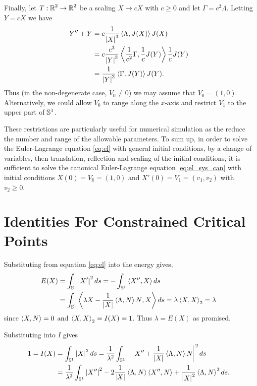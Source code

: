 \documentclass[12pt]{article}
\begin{document}
Finally, let \(T : \operatorname{\mathbb{R}}^2 \to \operatorname{\mathbb{R}}^2\) be a scaling \(X \mapsto cX\) with \(c \geq 0\) and let \(\Gamma = c^2 \Lambda\). Letting \(Y = cX\) we have
\[
\begin{split}
Y'' + Y &= c \frac{1}{\left|{X}\right|^3} \left\langle{\Lambda},{J(X)}\right\rangle J(X) \\
&= c \frac{c^3}{\left|{Y}\right|^3} \left\langle{\frac{1}{c^2} \Gamma},{\frac{1}{c} J(Y)}\right\rangle \frac{1}{c} J(Y) \\
&= \frac{1}{\left|{Y}\right|^3} \left\langle{\Gamma},{J(Y)}\right\rangle J(Y).
\end{split}
\]
Thus (in the non-degenerate case, \(V_0 \ne 0\)) we may assume that \(V_0 = (1, 0)\). Alternatively, we could allow \(V_0\) to range along the \(x\)-axis and restrict \(V_1\) to the upper part of \(\operatorname{\mathbb{S}^1}\).

These restrictions are particularly useful for numerical simulation as the reduce the number and range of the allowable parameters. To sum up, in order to solve the Euler-Lagrange equation \eqref{eq:el} with general initial conditions, by a change of variables, then translation, reflection and scaling of the initial conditions, it is sufficient to solve the canonical Euler-Lagrange equation \eqref{eq:el_sys_can} with initial conditions \(X(0) = V_0 = (1, 0)\) and \(X'(0) = V_1 = (v_1, v_2)\) with \(v_2 \geq 0\).

\section{Identities For Constrained Critical Points}

Substituting from equation \eqref{eq:el} into the energy gives,
\begin{equation}
\label{eq:Ecrit}
\begin{split}
E(X) &= \int_{\operatorname{\mathbb{S}^1}} \left|{X'}\right|^2 ds = -\int_{\operatorname{\mathbb{S}^1}} \left\langle{X''},{X}\right\rangle ds \\
&= \int_{\operatorname{\mathbb{S}^1}} \left\langle{\lambda X - \frac{1}{\left|{X}\right|} \ensuremath{\left\langle{\Lambda},{N}\right\rangle}N},{X}\right\rangle ds = \lambda \left\langle{X},{X}\right\rangle_2 = \lambda
\end{split}
\end{equation}
since \(\left\langle{X},{N}\right\rangle = 0\) and \(\left\langle{X},{X}\right\rangle_2 = I(X) = 1\). Thus \(\lambda = E(X)\) as promised.

Substituting into \(I\) gives
\begin{equation}
\label{eq:Icrit}
\begin{split}
1 = I(X) &= \int_{\operatorname{\mathbb{S}^1}} \left|{X}\right|^2 ds = \frac{1}{\lambda^2} \int_{\operatorname{\mathbb{S}^1}} \left|{-X'' +  \frac{1}{\left|{X}\right|} \left\langle{\Lambda},{N}\right\rangle N}\right|^2 ds \\
&= \frac{1}{\lambda^2} \int_{\operatorname{\mathbb{S}^1}} \left|{X''}\right|^2 - 2\frac{1}{\left|{X}\right|} \left\langle{\Lambda},{N}\right\rangle\left\langle{X''},{N}\right\rangle + \frac{1}{\left|{X}\right|^2} \left\langle{\Lambda},{N}\right\rangle^2 ds.
\end{split}
\end{equation}
\end{document}
